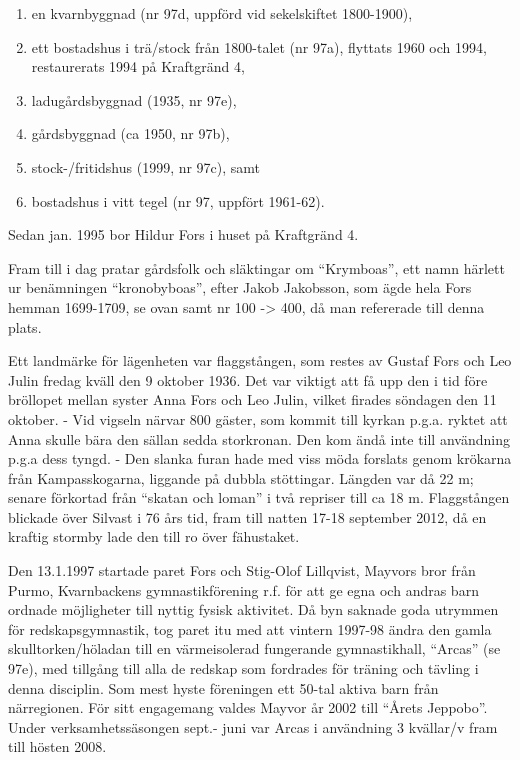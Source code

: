 \begin{enumerate}
  \item en kvarnbyggnad (nr 97d, uppförd vid sekelskiftet 1800-1900),
  \item ett bostadshus i trä/stock från 1800-talet (nr 97a), flyttats 1960 och 1994, restaurerats 1994 på Kraftgränd 4,
  \item ladugårdsbyggnad (1935, nr 97e),
  \item gårdsbyggnad (ca 1950, nr 97b),
  \item stock-/fritidshus (1999, nr 97c), samt
  \item bostadshus i vitt tegel (nr 97, uppfört 1961-62).
\end{enumerate}

Sedan jan. 1995 bor Hildur Fors i huset på Kraftgränd 4.


Fram till i dag pratar gårdsfolk och släktingar om ``Krymboas'', ett namn härlett ur benämningen ``kronobyboas'', efter Jakob Jakobsson, 	som ägde hela Fors hemman 1699-1709, se ovan samt nr 100 -> 400, då man refererade till denna plats.

Ett landmärke för lägenheten var flaggstången, som restes av Gustaf	Fors och Leo Julin fredag kväll den 9 oktober 1936. Det var viktigt att få upp den i tid före bröllopet mellan syster Anna Fors och Leo Julin, vilket firades söndagen den 11 oktober. - Vid vigseln närvar 800	gäster, som kommit till kyrkan p.g.a. ryktet att Anna skulle bära den	sällan sedda storkronan. Den kom ändå inte till användning p.g.a	dess tyngd. - Den slanka furan hade med viss möda forslats genom	krökarna från Kampasskogarna, liggande på dubbla stöttingar. Längden var då 22 m; senare förkortad från ``skatan och loman''  i två	repriser till ca 18 m. Flaggstången blickade över Silvast i 76 års tid,	fram till natten 17-18 september 2012, då en kraftig stormby lade den till ro över fähustaket.

Den 13.1.1997 startade paret Fors och Stig-Olof Lillqvist, Mayvors	bror från Purmo, Kvarnbackens gymnastikförening r.f. för att ge	egna och andras barn ordnade möjligheter till nyttig fysisk aktivitet.	Då byn saknade goda utrymmen för redskapsgymnastik, tog paret itu med att vintern 1997-98 ändra den gamla	skulltorken/höladan till en värmeisolerad fungerande gymnastikhall,	``Arcas'' (se 97e), med tillgång till alla de redskap som fordrades för träning och tävling i denna disciplin. Som mest hyste föreningen ett 50-tal aktiva barn från närregionen. För sitt engagemang valdes Mayvor år 2002 till ``Årets Jeppobo''. Under verksamhetssäsongen sept.- juni var Arcas i användning 3 kvällar/v fram till hösten 2008.

